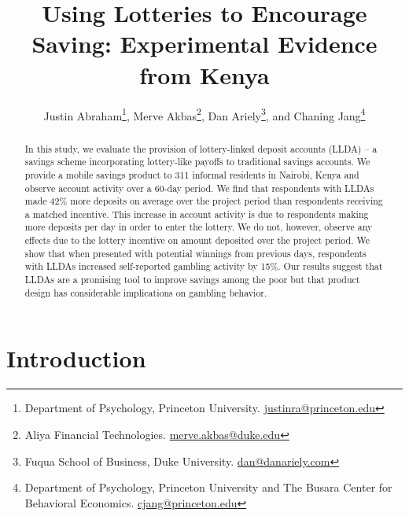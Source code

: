 \documentclass[10pt]{article}
\begin{document}
\onehalfspacing

\title{Using Lotteries to Encourage Saving: Experimental Evidence from Kenya}

\author{Justin Abraham\thanks{Department of Psychology, Princeton University. \protect\href{mailto:justinra@princeton.edu}{justinra@princeton.edu}}, Merve Akbas\thanks{Aliya Financial Technologies. \protect\href{mailto:merve.akbas@duke.edu}{merve.akbas@duke.edu}}, Dan Ariely\thanks{Fuqua School of Business, Duke University. \protect\href{mailto:dan@danariely.com}{dan@danariely.com}}, and Chaning Jang\thanks{Department of Psychology, Princeton University and The Busara Center for Behavioral Economics. \protect\href{mailto:cjang@princeton.edu}{cjang@princeton.edu}}}

\maketitle

\begin{abstract}
In this study, we evaluate the provision of lottery-linked deposit accounts (LLDA) -- a savings scheme incorporating lottery-like payoffs to traditional savings accounts. We provide a mobile savings product to 311 informal residents in Nairobi, Kenya and observe account activity over a 60-day period. We find that respondents with LLDAs made 42\% more deposits on average over the project period than respondents receiving a matched incentive. This increase in account activity is due to respondents making more deposits per day in order to enter the lottery. We do not, however, observe any effects due to the lottery incentive on amount deposited over the project period. We show that when presented with potential winnings from previous days, respondents with LLDAs increased self-reported gambling activity by 15\%. Our results suggest that LLDAs are a promising tool to improve savings among the poor but that product design has considerable implications on gambling behavior.
\end{abstract}

\newpage

\section{Introduction}
\end{document}
